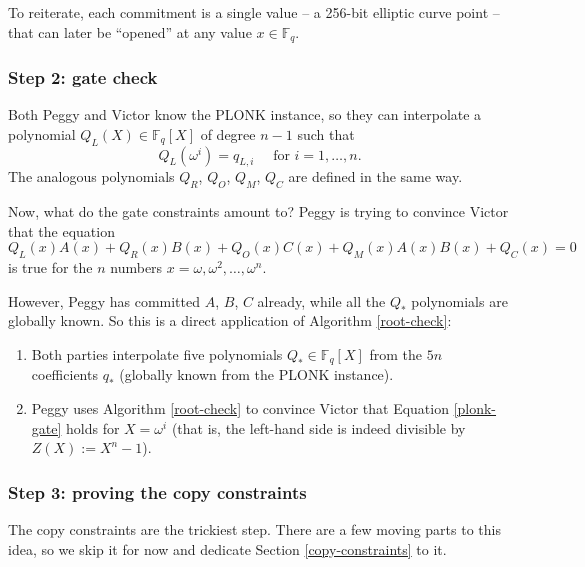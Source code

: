 To reiterate, each commitment is a single value -- a 256-bit elliptic
curve point -- that can later be ``opened'' at any value
\(x \in {\mathbb{F}}_{q}\).

\subsubsection{Step 2: gate check}

Both Peggy and Victor know the PLONK instance, so they can interpolate a
polynomial \(Q_{L}(X) \in {\mathbb{F}}_{q}[ X]\) of degree
\(n - 1\) such that
\[Q_{L}\left( \omega^{i} \right) = q_{L,i}\quad\text{ for  }i = 1,\ldots,n.\]
The analogous polynomials \(Q_{R}\), \(Q_{O}\), \(Q_{M}\), \(Q_{C}\) are
defined in the same way.

Now, what do the gate constraints amount to? Peggy is trying to convince
Victor that the equation 
\begin{equation}
\label{plonk-gate}
Q_{L}(x)A(x) + Q_{R}(x)B(x) + Q_{O}(x)C(x) + Q_{M}(x)A(x)B(x) + Q_{C}(x) = 0
\end{equation}
is true for the \(n\) numbers
\(x = \omega,\omega^{2},\ldots,\omega^{n}\).

However, Peggy has committed \(A\), \(B\), \(C\) already, while all the
\(Q_{\ast}\) polynomials are globally known. So this is a direct
application of Algorithm \ref{root-check}:

\begin{algo}
\leavevmode
\begin{enumerate}
\item
Both parties interpolate five polynomials
\(Q_{\ast} \in {\mathbb{F}}_{q}[X]\) from the \(5n\)
 coefficients \(q_{\ast}\) (globally known from the PLONK instance).
\item
Peggy uses Algorithm \ref{root-check} to convince Victor that
Equation \eqref{plonk-gate} holds for \(X = \omega^{i}\)
(that is, the left-hand side is indeed divisible by
\(Z(X) := X^{n} - 1\)).
\end{enumerate}
\end{algo}

\subsubsection{Step 3: proving the copy
constraints}\label{copy-constraint-deferred}

The copy constraints are the trickiest step. There are a few moving
parts to this idea, so we skip it for now and dedicate
Section \ref{copy-constraints} to it.

